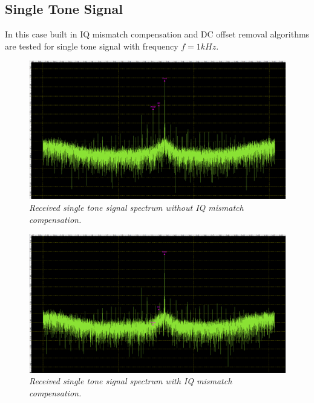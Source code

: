 \documentclass[en,printmode]{mgr}
\begin{document}
		\subsection*{Single Tone Signal}
		In this case built in IQ mismatch compensation and DC offset removal algorithms are
	 	tested for
		single tone signal with frequency $f=1kHz$.
		\begin{figure}[H]
    			\centering
   				\includegraphics[width=\textwidth]{plots/real_single_off.png}
   		 		\caption{\textit{Received single tone signal spectrum without IQ mismatch compensation.}}
   		 	\end{figure}
			\vspace{0.5cm}
   		 	\begin{figure}[H]
    			\centering
   				\includegraphics[width=\textwidth]{plots/real_single_on.png}
   		 		\caption{\textit{Received single tone signal spectrum with IQ mismatch compensation.}}
   		 	\end{figure}
   		\newpage
\end{document}
